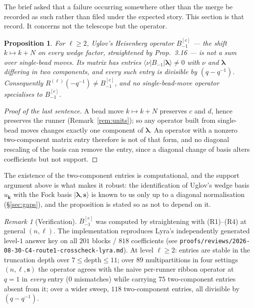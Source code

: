 \documentclass[11pt]{article}
\newtheorem{proposition}[theorem]{Proposition}
\theoremstyle{definition}
\theoremstyle{remark}
\newtheorem{remark}[theorem]{Remark}
\newcommand{\bl}{\boldsymbol{\lambda}}
\newcommand{\bs}{\mathbf{s}}
\newcommand{\ket}[1]{\lvert #1 \rangle}
\begin{document}
The brief asked that a failure occurring somewhere other than the merge be recorded as
such rather than filed under the expected story. This section is that record. It
concerns not the telescope but the operator.

\begin{proposition}\label{prop:heis}
For $\ell\ge2$, Uglov's Heisenberg operator $B^{[e]}_{-1}$ --- the shift $k\mapsto k+N$
on every wedge factor, straightened by Prop.\ 3.16 --- is not a sum over single-bead
moves. Its matrix has entries $\langle\nu|B_{-1}|\bl\rangle\neq0$ with $\nu$ and $\bl$
differing in \emph{two} components, and every such entry is divisible by $(q-q^{-1})$.
Consequently $R^{(\ell)}(-q^{-1})\neq B^{[e]}_{-1}$, and no single-bead-move operator
specialises to $B^{[e]}_{-1}$.
\end{proposition}

\begin{proof}[Proof of the last sentence]
A bead move $k\mapsto k+N$ preserves $c$ and $d$, hence preserves the runner
(Remark~\ref{rem:units}); so any operator built from single-bead moves changes exactly
one component of $\bl$. An operator with a nonzero two-component matrix entry therefore
is not of that form, and no diagonal rescaling of the basis can remove the entry, since
a diagonal change of basis alters coefficients but not support.
\end{proof}

The existence of the two-component entries is computational, and the support argument
above is what makes it robust: the identification of Uglov's wedge basis $u_{\mathbf k}$
with the Fock basis $\ket{\bl,\bs}$ is known to us only up to a diagonal normalisation
(\S\ref{sec:gaps}), and the proposition is stated so as not to depend on it.

\begin{remark}[Verification]
$B^{[e]}_{-1}$ was computed by straightening with (R1)--(R4) at general $(n,\ell)$.
The implementation reproduces Lyra's independently generated level-$1$ answer key on
all $201$ blocks / $818$ coefficients (see
\texttt{proofs/reviews/2026-08-30-C4-route1-crosscheck-lyra.md}). At level $\ell\ge2$:
entries are stable in the truncation depth over $7\le\text{depth}\le11$; over $89$
multipartitions in four settings $(n,\ell,\bs)$ the operator agrees with the naive
per-runner ribbon operator at $q=1$ in \emph{every} entry ($0$ mismatches) while
carrying $75$ two-component entries absent from it; over a wider sweep, $118$
two-component entries, all divisible by $(q-q^{-1})$.
\end{remark}
\end{document}
